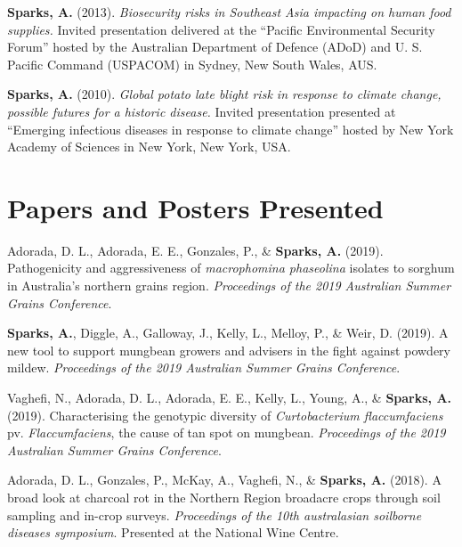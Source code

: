 \documentclass[11pt, a4paper]{awesome-cv}
\begin{document}
\textbf{Sparks, A.} (2013). \emph{Biosecurity risks in Southeast Asia impacting on human food supplies.} Invited presentation delivered at the ``Pacific Environmental Security Forum'' hosted by the Australian Department of Defence (ADoD) and U. S. Pacific Command (USPACOM) in Sydney, New South Wales, AUS.

\textbf{Sparks, A.} (2010). \emph{Global potato late blight risk in response to climate change, possible futures for a historic disease.} Invited presentation presented at ``Emerging infectious diseases in response to climate change'' hosted by New York Academy of Sciences in New York, New York, USA.

\endgroup

\hypertarget{papers-and-posters-presented}{%
\section{Papers and Posters Presented}\label{papers-and-posters-presented}}

\begingroup
\setlength{\parindent}{-0.5in}
\setlength{\leftskip}{0.5in}

\hypertarget{refs_proceedings}{}
\leavevmode\hypertarget{ref-Adorada2019}{}%
Adorada, D. L., Adorada, E. E., Gonzales, P., \& \textbf{Sparks, A.} (2019). Pathogenicity and aggressiveness of \emph{macrophomina phaseolina} isolates to sorghum in Australia's northern grains region. \emph{Proceedings of the 2019 Australian Summer Grains Conference}.

\leavevmode\hypertarget{ref-Sparks2019ASGC}{}%
\textbf{Sparks, A.}, Diggle, A., Galloway, J., Kelly, L., Melloy, P., \& Weir, D. (2019). A new tool to support mungbean growers and advisers in the fight against powdery mildew. \emph{Proceedings of the 2019 Australian Summer Grains Conference}.

\leavevmode\hypertarget{ref-Vaghefi2019}{}%
Vaghefi, N., Adorada, D. L., Adorada, E. E., Kelly, L., Young, A., \& \textbf{Sparks, A.} (2019). Characterising the genotypic diversity of \emph{Curtobacterium flaccumfaciens} pv. \emph{Flaccumfaciens}, the cause of tan spot on mungbean. \emph{Proceedings of the 2019 Australian Summer Grains Conference}.

\leavevmode\hypertarget{ref-Adorada2018}{}%
Adorada, D. L., Gonzales, P., McKay, A., Vaghefi, N., \& \textbf{Sparks, A.} (2018). A broad look at charcoal rot in the Northern Region broadacre crops through soil sampling and in-crop surveys. \emph{Proceedings of the 10th australasian soilborne diseases symposium}. Presented at the National Wine Centre.
\end{document}
